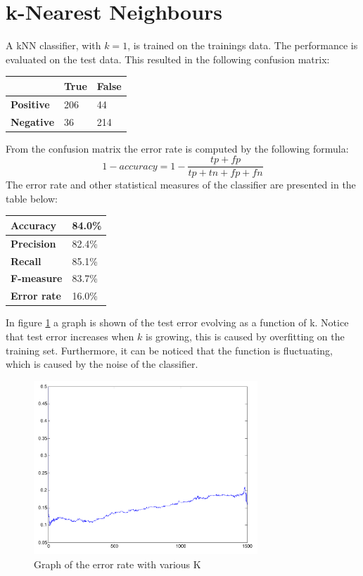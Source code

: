 \documentclass[a4paper]{article}
\begin{document}
\section{k-Nearest Neighbours}
A kNN classifier, with $k = 1$, is trained on the trainings data. The performance is evaluated on the test data. This resulted in the following confusion matrix:
\begin{center}
\begin{tabular}{ | l | l | l | }
\hline
 & \textbf{True} & \textbf{False}\\
\hline
\textbf{Positive} & 206 & 44\\
\hline
\textbf{Negative} & 36 & 214\\
\hline
\end{tabular}
\end{center}
From the confusion matrix the error rate is computed by the following formula:
\begin{equation}
1 - accuracy = 1 - \frac{tp + fp}{tp + tn + fp + fn}
\end{equation}
The error rate and other statistical measures of the classifier are presented in the table below:
\begin{center}
\begin{tabular}{ | l | l | }
\hline
\textbf{Accuracy} & 84.0\%\\
\hline
\textbf{Precision} & 82.4\%\\
\hline
\textbf{Recall} & 85.1\%\\
\hline
\textbf{F-measure} & 83.7\%\\
\hline
\textbf{Error rate} & 16.0\%\\
\hline
\end{tabular}
\end{center}
In figure \ref{error_rate} a graph is shown of the test error evolving as a function of k. Notice that test error increases when $k$ is growing, this is caused by overfitting on the training set. Furthermore, it can be noticed that the function is fluctuating, which is caused by the noise of the classifier.
\begin{figure}[!ht]
\centering
\includegraphics[width=0.75\textwidth]{images/error_rate_1500_1.pdf}
\caption{Graph of the error rate with various K}
\label{error_rate}
\end{figure}\\
\end{document}
